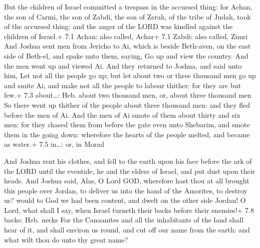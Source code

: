  But the children of Israel committed a trespass in the
accursed thing: for Achan, the son of Carmi, the son of Zabdi, the son
of Zerah, of the tribe of Judah, took of the accursed thing: and the
anger of the LORD was kindled against the children of Israel.+ 7.1
Achan: also called, Achar+ 7.1 Zabdi: also called, Zimri 
And Joshua sent men from Jericho to Ai, which is beside Beth-aven, on
the east side of Beth-el, and spake unto them, saying, Go up and view
the country. And the men went up and viewed Ai.  And they
returned to Joshua, and said unto him, Let not all the people go up; but
let about two or three thousand men go up and smite Ai; and make not all
the people to labour thither; for they are but few.+ 7.3 about\ldots:
Heb. about two thousand men, or, about three thousand men 
So there went up thither of the people about three thousand men: and
they fled before the men of Ai.  And the men of Ai smote of
them about thirty and six men: for they chased them from before the gate
even unto Shebarim, and smote them in the going down: wherefore the
hearts of the people melted, and became as water.+ 7.5 in\ldots: or, in
Morad

 And Joshua rent his clothes, and fell to the earth upon
his face before the ark of the LORD until the eventide, he and the
elders of Israel, and put dust upon their heads.  And Joshua
said, Alas, O Lord GOD, wherefore hast thou at all brought this people
over Jordan, to deliver us into the hand of the Amorites, to destroy us?
would to God we had been content, and dwelt on the other side Jordan!
 O Lord, what shall I say, when Israel turneth their backs
before their enemies!+ 7.8 backs: Heb. necks  For the
Canaanites and all the inhabitants of the land shall hear of it, and
shall environ us round, and cut off our name from the earth: and what
wilt thou do unto thy great name?

